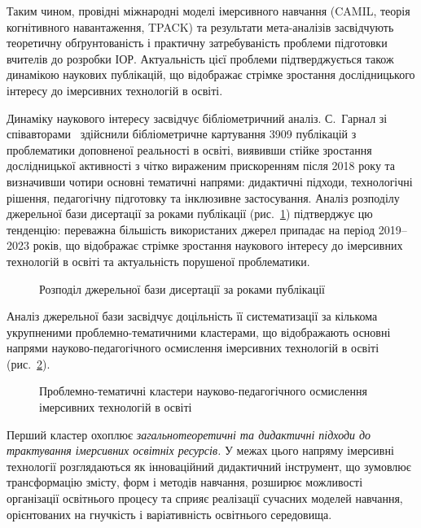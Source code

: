 
Таким чином, провідні міжнародні моделі імерсивного навчання (CAMIL, теорія когнітивного навантаження, TPACK) та результати мета-аналізів засвідчують теоретичну обґрунтованість і практичну затребуваність проблеми підготовки вчителів до розробки ІОР. Актуальність цієї проблеми підтверджується також динамікою наукових публікацій, що відображає стрімке зростання дослідницького інтересу до імерсивних технологій в освіті.

Динаміку наукового інтересу засвідчує бібліометричний аналіз. С.~Гарнал зі співавторами~\cite{Harnal2023Bibliometric} здійснили бібліометричне картування 3909 публікацій з проблематики доповненої реальності в освіті, виявивши стійке зростання дослідницької активності з чітко вираженим прискоренням після 2018 року та визначивши чотири основні тематичні напрями: дидактичні підходи, технологічні рішення, педагогічну підготовку та інклюзивне застосування. Аналіз розподілу джерельної бази дисертації за роками публікації (рис.~\ref{fig:biblio_dynamics}) підтверджує цю тенденцію: переважна більшість використаних джерел припадає на період 2019--2023 років, що відображає стрімке зростання наукового інтересу до імерсивних технологій в освіті та актуальність порушеної проблематики.

\begin{figure}[!h]
\centering

\caption{Розподіл джерельної бази дисертації за роками публікації}
\label{fig:biblio_dynamics}
\end{figure}


Аналіз джерельної бази засвідчує доцільність її систематизації за кількома укрупненими проблемно-тематичними кластерами, що відображають основні напрями науково-педагогічного осмислення імерсивних технологій в освіті (рис.~\ref{fig:1.1}).

\begin{figure}[!h]
\centering

\caption{Проблемно-тематичні кластери науково-педагогічного осмислення імерсивних технологій в освіті}
\label{fig:1.1}
\end{figure}

Перший кластер охоплює \emph{{загальнотеоретичні та дидактичні підходи до трактування імерсивних освітніх ресурсів}.} У межах цього напряму імерсивні технології розглядаються як інноваційний дидактичний інструмент, що зумовлює трансформацію змісту, форм і методів навчання, розширює можливості організації освітнього процесу та сприяє реалізації сучасних моделей навчання, орієнтованих на гнучкість і варіативність освітнього середовища.

